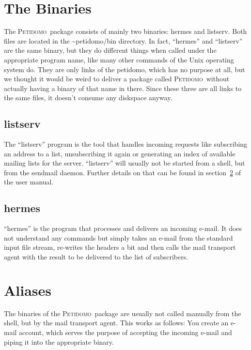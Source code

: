 \documentclass[a4paper,10pt]{scrreprt}
\newcommand{\Petidomo}{{\scshape Peti\-domo}}
\newcommand{\file}[1]{{\sf #1}}
\begin{document}
\section{The Binaries}

The \Petidomo\ package consists of mainly two binaries:
\file{hermes} and \file{listserv}. Both
files are located in the \file{\~{}petidomo/bin} directory. In fact,
``hermes'' and ``listserv'' are the same binary, but they do different
things when called under the appropriate program name, like many other
commands of the Unix operating system do. They are only links of the
\file{petidomo}, which has no purpose
at all, but we thought it would be weird to deliver a package called
\Petidomo\ without actually having a binary of that name in there.
Since these three are all links to the same files, it doesn't consume
any diskspace anyway.

\subsection{listserv}

The ``listserv'' program is the tool that handles incoming requests
like subscribing an address to a list, unsubscribing it again or
generating an index of available mailing lists for the server.
``listserv'' will usually not be started from a shell, but from the
sendmail daemon. Further details on that can be found in
section~\ref{aliases} of the user manual.

\subsection{hermes}

``hermes'' is the program that processes and delivers an incoming
e-mail. It does not understand any commands but simply takes an e-mail
from the standard input file stream, re-writes the headers a bit and
then calls the mail transport agent with the result to be delivered to
the list of subscribers.

\section{Aliases}
\label{aliases}

The binaries of the \Petidomo\ package are usually not called manually
from the shell, but by the mail transport agent. This works as
follows: You create an e-mail account, which serves the purpose of
accepting the incoming e-mail and piping it into the appropriate
binary.
\end{document}
